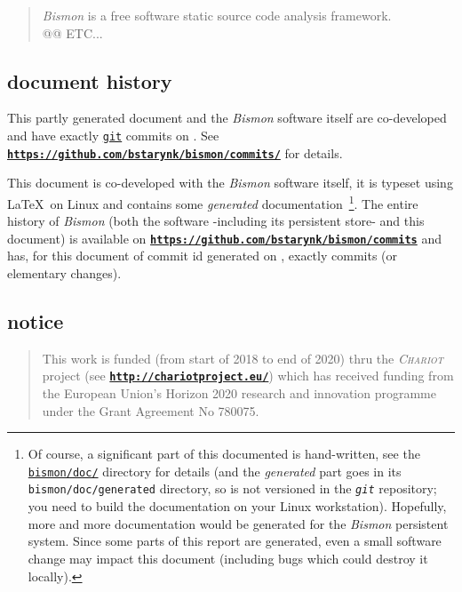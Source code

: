 \documentclass[11pt,a4paper]{article}
\newcommand{\bmurl}[1]{{\href{#1}{\texttt{\textbf{#1}}}}}
\begin{document}
\begin{titlepage}
\begin{abstract}
  \textit{Bismon} is a free software static source code analysis framework. \\
  @@ ETC...
\end{abstract}

\newpage


\subsection*{document history}
This partly generated document and the \emph{Bismon} software itself
are co-developed and have exactly {\bmgitnumbercommits} \href{http://git-scm.com/}{\texttt{git}}
commits on \textit{\bmdoctimestamp}. See
\bmurl{https://github.com/bstarynk/bismon/commits/} for details.

\begin{relsize}{-0.5}
This document is co-developed with the \emph{Bismon} software itself,
it is typeset using \LaTeX~on Linux and contains some \emph{generated}
documentation~\footnote{Of course, a significant part of this
  documented is hand-written, see the
  \href{https://github.com/bstarynk/bismon/tree/master/doc}{\texttt{bismon/doc/}}
  directory for details (and the \emph {generated} part goes in its
  \texttt{bismon/doc/generated} directory, so is not versioned in the
  \emph{\texttt{git}} repository; you need to build the documentation
  on your Linux workstation). Hopefully, more and more documentation
  would be generated for the \emph{Bismon} persistent system. Since
  some parts of this report are generated, even a small software
  change may impact this document (including bugs which could destroy
  it locally).}. The entire history of \emph{Bismon} (both the
software -including its persistent store- and this document) is
available on \bmurl{https://github.com/bstarynk/bismon/commits} and
has, for this document of commit id \texttt{\bmgitcommit} generated on
\textit{\bmdocdate}, exactly {\bmgitnumbercommits} commits (or
elementary changes).
\end{relsize}
\bigskip

\subsection*{notice}

\begin{quote}
\begin{relsize}{-2}
\footnotesize This work is funded (from start of 2018 to end of
2020) thru the \emph{\textsc{Chariot}} project (see \bmurl{http://chariotproject.eu/})
which has received funding from the European Union’s Horizon 2020
research and innovation programme under the Grant Agreement No
780075.
\end{relsize}
\end{quote}
\medskip




\end{titlepage}
\end{document}
